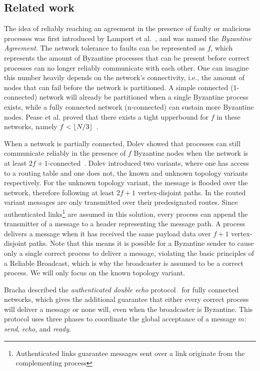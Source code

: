 \subsection*{Related work}
The idea of reliably reaching an agreement in the presence of faulty or malicious processes was first introduced by Lamport et al.~\cite{lamport2019byzantine}, and was named the \textit{Byzantine Agreement}. The network tolerance to faults can be represented as $f$, which represents the amount of Byzantine processes that can be present before correct processes can no longer reliably communicate with each other. One can imagine this number heavily depends on the network's connectivity, i.e., the amount of nodes that can fail before the network is partitioned. A simple connected (1-connected) network will already be partitioned when a single Byzantine process exists, while a fully connected network (n-connected) can sustain more Byzantine nodes. Pease et al. proved that there exists a tight upperbound for $f$ in these networks, namely $f < \lfloor N/3\rfloor$~\cite{pease1980reaching}.

When a network is partially connected, Dolev showed that processes can still communicate reliably in the presence of $f$ Byzantine nodes when the network is at least $2f+1$-connected~\cite{dolev}. Dolev introduced two variants, where one has access to a routing table and one does not, the known and unknown topology variants respectively. For the unknown topology variant, the message is flooded over the network, therefore following at least $2f+1$ vertex-disjoint paths. In the routed variant messages are only transmitted over their predesignated routes.
Since authenticated links\footnote{Authenticated links guarantee messages sent over a link originate from the complementing process} are assumed in this solution, every process can append the transmitter of a message to a header representing the message path. A process delivers a message when it has received the same payload data over $f+1$ vertex-disjoint paths. Note that this means it is possible for a Byzantine sender to cause only a single correct process to deliver a message, violating the basic principles of a Reliable Broadcast, which is why the broadcaster is assumed to be a correct process. We will only focus on the known topology variant.

Bracha described the \textit{authenticated double echo} protocol~\cite{bracha} for fully connected networks, which gives the additional guarantee that either every correct process will deliver a message or none will, even when the broadcaster is Byzantine. This protocol uses three phases to coordinate the global acceptance of a message $m$: \textit{send}, \textit{echo}, and \textit{ready}.

